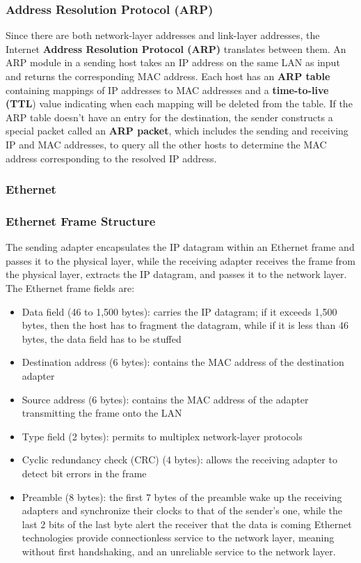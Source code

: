 \documentclass{article}
\begin{document}
\subsubsection*{Address Resolution Protocol (ARP)}
Since there are both network-layer addresses and link-layer addresses, the Internet \textbf{Address Resolution Protocol (ARP)} translates between them.
An ARP module in a sending host takes an IP address on the same LAN as input and returns the corresponding MAC address.
Each host has an \textbf{ARP table} containing mappings of IP addresses to MAC addresses and a \textbf{time-to-live (TTL}) value indicating when each mapping will be deleted from the table.
If the ARP table doesn’t have an entry for the destination, the sender constructs a special packet called an \textbf{ARP packet}, which includes the sending and receiving IP and MAC addresses, to query all the other hosts to determine the MAC address corresponding to the resolved IP address.
\subsubsection{Ethernet}
\subsubsection*{Ethernet Frame Structure}
The sending adapter encapsulates the IP datagram within an Ethernet frame and passes it to the physical layer, while the receiving adapter receives the frame from the physical layer, extracts the IP datagram, and passes it to the network layer.
The Ethernet frame fields are:
\begin{itemize}
    \item Data field (46 to 1,500 bytes): carries the IP datagram; if it exceeds 1,500 bytes, then the host has to fragment the datagram, while if it is less than 46 bytes, the data field has to be stuffed
    \item Destination address (6 bytes): contains the MAC address of the destination adapter
    \item Source address (6 bytes): contains the MAC address of the adapter transmitting the frame onto the LAN
    \item Type field (2 bytes): permits to multiplex network-layer protocols
    \item Cyclic redundancy check (CRC) (4 bytes): allows the receiving adapter to detect bit errors in the frame
    \item Preamble (8 bytes): the first 7 bytes of the preamble wake up the receiving adapters and synchronize their clocks to that of the sender’s one, while the last 2 bits of the last byte alert the receiver that the data is coming
Ethernet technologies provide connectionless service to the network layer, meaning without first handshaking, and an unreliable service to the network layer.
\end{itemize}
\end{document}
